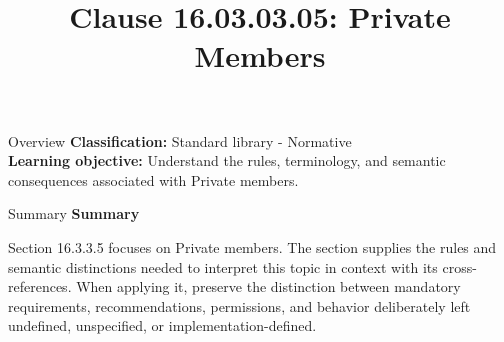 \documentclass[10pt,letterpaper]{article}
\title{Clause 16.03.03.05: Private Members}
\author{}
\date{}
\begin{document}
\maketitle
\begin{CornellOverviewBox}{Overview}
\textbf{Classification:} Standard library - Normative\\[2pt]
\textbf{Learning objective:} Understand the rules, terminology, and semantic consequences associated with Private members.
\end{CornellOverviewBox}\begin{CornellSummaryBox}{Summary}
{\sffamily\bfseries\color{Accent} Summary}\par\vspace{3pt}Section 16.3.3.5 focuses on Private members. The section supplies the rules and semantic distinctions needed to interpret this topic in context with its cross-references. When applying it, preserve the distinction between mandatory requirements, recommendations, permissions, and behavior deliberately left undefined, unspecified, or implementation-defined.
\end{CornellSummaryBox}
\end{document}
